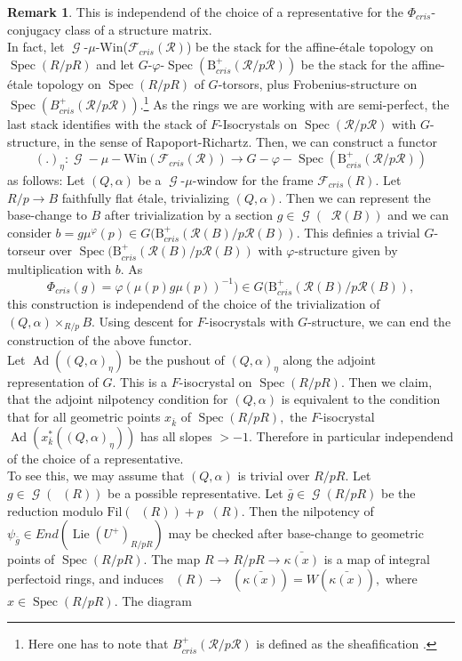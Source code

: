 \documentclass[a4paper,10,5 pt]{amsart}
\theoremstyle{definition}
\newtheorem{Remark}{Remark}
\DeclareMathOperator{\Lie}{Lie}
\DeclareMathOperator{\Spec}{Spec}
\DeclareMathOperator{\Acris}{\mathbb{A}_{cris}}
\DeclareMathOperator{\Ad}{Ad}
\DeclareMathOperator{\G}{\mathcal{G}}
\begin{document}
\begin{Remark}
This is independend of the choice of a representative for the $\Phi_{cris}$-conjugacy class of a structure matrix. 
\\
In fact, let $\G$-$\mu$-Win($\mathcal{F}_{cris}(\mathcal{R})$) be the stack for the affine-étale topology on $\Spec(R/pR)$ and let $G$-$\varphi$-$\Spec(\text{B}_{cris}^{+}(\mathcal{R}/p\mathcal{R}))$ be the stack for the affine-étale topology on $\Spec(R/pR)$ of $G$-torsors, plus Frobenius-structure on $\Spec(B^{+}_{cris}(\mathcal{R}/p\mathcal{R})).$\footnote{Here one has to note that $B^{+}_{cris}(\mathcal{R}/p\mathcal{R})$ is defined as the sheafification .} As the rings we are working with are semi-perfect, the last stack identifies with the stack of $F$-Isocrystals on $\Spec(\mathcal{R}/p\mathcal{R})$ with $G$-structure, in the sense of Rapoport-Richartz. Then, we can construct a functor
$$
(.)_{\eta}\colon \G-\mu-\text{Win}(\mathcal{F}_{cris}(\mathcal{R}))\rightarrow G-\varphi-\Spec(\text{B}_{cris}^{+}(\mathcal{R}/p\mathcal{R}))
$$
as follows: Let $(Q,\alpha)$ be a $\G$-$\mu$-window for the frame $\mathcal{F}_{cris}(R).$ Let $R/p\rightarrow B$ faithfully flat étale, trivializing $(Q,\alpha).$ Then we can represent the base-change to $B$ after trivialization by a section $g\in \G(\Acris\mathcal{R}(B))$ and we can consider $b=g\mu^{\varphi}(p)\in G(\text{B}_{cris}^{+}(\mathcal{R}(B)/p\mathcal{R}(B)).$ This definies a trivial $G$-torseur over $\Spec(\text{B}_{cris}^{+}(\mathcal{R}(B)/p\mathcal{R}(B))$ with $\varphi$-structure given by multiplication with $b.$ As
$$
\Phi_{cris}(g)=\varphi(\mu(p)g\mu(p))^{-1})\in G(\text{B}_{cris}^{+}(\mathcal{R}(B)/p\mathcal{R}(B)),
$$
this construction is independend of the choice of the trivialization of $(Q,\alpha)\times_{R/p} B.$ Using descent for $F$-isocrystals with $G$-structure, we can end the construction of the above functor.
\\
Let $\Ad((Q,\alpha)_{\eta})$ be the pushout of $(Q,\alpha)_{\eta}$ along the adjoint representation of $G.$ This is a $F$-isocrystal on $\Spec(R/pR).$ Then we claim, that the adjoint nilpotency condition for $(Q,\alpha)$ is equivalent to the condition that for all geometric points $x_{\bar{k}}$ of $\Spec(R/pR),$ the $F$-isocrystal $ \Ad(x_{\bar{k}}^{*}((Q,\alpha)_{\eta}))$ has all slopes $>-1.$ Therefore in particular independend of the choice of a representative.
\\
To see this, we may assume that $(Q,\alpha)$ is trivial over $R/pR.$ Let $g\in \G(\Acris(R))$ be a possible representative. Let $\bar{g} \in\G(R/pR)$ be the reduction modulo $\text{Fil}(\Acris(R))+p\Acris(R).$ Then the nilpotency of $\psi_{\bar{g}}\in End(\Lie(U^{+})_{R/pR})$ may be checked after base-change to geometric points of $\Spec(R/pR).$ The map $R\rightarrow R/pR \rightarrow \bar{\kappa(x)}$ is a map of integral perfectoid rings, and induces $\Acris(R)\rightarrow \Acris(\bar{\kappa(x)})=W(\bar{\kappa(x)}),$ where $x\in \Spec(R/pR).$ The diagram

\end{Remark}
\end{document}

